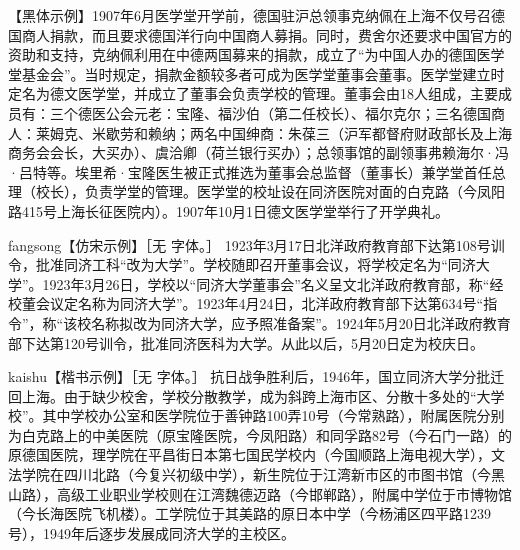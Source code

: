{\heiti 【黑体示例】1907年6月医学堂开学前，德国驻沪总领事克纳佩在上海不仅号召德国商人捐款，而且要求德国洋行向中国商人募捐。同时，费舍尔还要求中国官方的资助和支持，克纳佩利用在中德两国募来的捐款，成立了“为中国人办的德国医学堂基金会”。当时规定，捐款金额较多者可成为医学堂董事会董事。医学堂建立时定名为德文医学堂，并成立了董事会负责学校的管理。董事会由18人组成，主要成员有：三个德医公会元老：宝隆、福沙伯（第二任校长）、福尔克尔；三名德国商人：莱姆克、米歇劳和赖纳；两名中国绅商：朱葆三（沪军都督府财政部长及上海商务会会长，大买办）、虞洽卿（荷兰银行买办）；总领事馆的副领事弗赖海尔·冯·吕特等。埃里希·宝隆医生被正式推选为董事会总监督（董事长）兼学堂首任总理（校长），负责学堂的管理。医学堂的校址设在同济医院对面的白克路（今凤阳路415号上海长征医院内）。1907年10月1日德文医学堂举行了开学典礼。}

{\ifcsname fangsong\endcsname\fangsong【仿宋示例】\else［无  字体。］\fi
1923年3月17日北洋政府教育部下达第108号训令，批准同济工科“改为大学”。学校随即召开董事会议，将学校定名为“同济大学”。1923年3月26日，学校以“同济大学董事会”名义呈文北洋政府教育部，称“经校董会议定名称为同济大学”。1923年4月24日，北洋政府教育部下达第634号“指令”，称“该校名称拟改为同济大学，应予照准备案”。1924年5月20日北洋政府教育部下达第120号训令，批准同济医科为大学。从此以后，5月20日定为校庆日。}

{\ifcsname kaishu\endcsname\kaishu【楷书示例】\else［无  字体。］\fi
抗日战争胜利后，1946年，国立同济大学分批迁回上海。由于缺少校舍，学校分散教学，成为斜跨上海市区、分散十多处的“大学校”。其中学校办公室和医学院位于善钟路100弄10号（今常熟路），附属医院分别为白克路上的中美医院（原宝隆医院，今凤阳路）和同孚路82号（今石门一路）的原德国医院，理学院在平昌街日本第七国民学校内（今国顺路上海电视大学），文法学院在四川北路（今复兴初级中学），新生院位于江湾新市区的市图书馆（今黑山路），高级工业职业学校则在江湾魏德迈路（今邯郸路），附属中学位于市博物馆（今长海医院飞机楼）。工学院位于其美路的原日本中学（今杨浦区四平路1239号），1949年后逐步发展成同济大学的主校区。}

